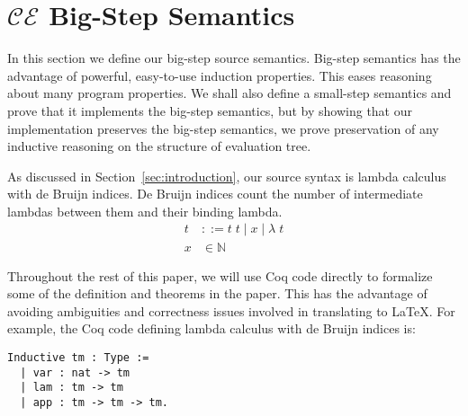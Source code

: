 \section{$\mathcal{CE}$ Big-Step Semantics} \label{sec:cem_big}

In this section we define our big-step source semantics. Big-step semantics
has the advantage of powerful, easy-to-use induction properties. This eases
reasoning about many program properties. We shall also define a small-step
semantics and prove that it implements the big-step semantics, but by showing
that our implementation preserves the big-step semantics, we prove preservation
of any inductive reasoning on the structure of evaluation tree.  

As discussed in Section~\ref{sec:introduction}, our source syntax is lambda calculus with
de Bruijn indices. De Bruijn indices count the number of intermediate lambdas
between them and their binding lambda.  
\begin{align*}
 t &::= t \; t \; | \; x \; | \;  \lambda \; t \\
 x &\in \mathbb{N}
\end{align*}

Throughout the rest of this paper, we will use Coq code directly to formalize
some of the definition and theorems in the paper. This has the advantage of
avoiding ambiguities and correctness issues involved in translating to \LaTeX.
For example, the Coq code defining lambda calculus with de Bruijn indices is: 

\begin{lstlisting}
Inductive tm : Type := 
  | var : nat -> tm 
  | lam : tm -> tm
  | app : tm -> tm -> tm.
\end{lstlisting}

